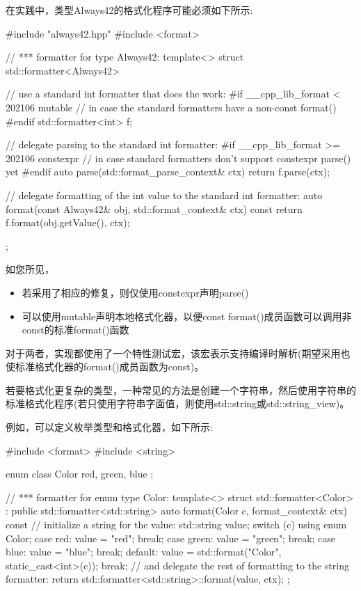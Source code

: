 在实践中，类型Always42的格式化程序可能必须如下所示:


\begin{cpp}
#include "always42.hpp"
#include <format>

// *** formatter for type Always42:
template<>
struct std::formatter<Always42>
{
	// use a standard int formatter that does the work:
#if __cpp_lib_format < 202106
	mutable // in case the standard formatters have a non-const format()
#endif
	std::formatter<int> f;
	
	// delegate parsing to the standard int formatter:
#if __cpp_lib_format >= 202106
	constexpr // in case standard formatters don’t support constexpr parse() yet
#endif
	auto parse(std::format_parse_context& ctx) {
		return f.parse(ctx);
	}
	
	// delegate formatting of the int value to the standard int formatter:
	auto format(const Always42& obj, std::format_context& ctx) const {
		return f.format(obj.getValue(), ctx);
	}
};
\end{cpp}

如您所见，

\begin{itemize}
\item
若采用了相应的修复，则仅使用constexpr声明parse()

\item
可以使用mutable声明本地格式化器，以便const format()成员函数可以调用非const的标准format()函数
\end{itemize}

对于两者，实现都使用了一个特性测试宏，该宏表示支持编译时解析(期望采用也使标准格式化器的format()成员函数为const)。


若要格式化更复杂的类型，一种常见的方法是创建一个字符串，然后使用字符串的标准格式化程序(若只使用字符串字面值，则使用std::string或std::string\_view)。

例如，可以定义枚举类型和格式化器，如下所示:


\begin{cpp}
#include <format>
#include <string>

enum class Color { red, green, blue };

// *** formatter for enum type Color:
template<>
struct std::formatter<Color> : public std::formatter<std::string>
{
	auto format(Color c, format_context& ctx) const {
		// initialize a string for the value:
		std::string value;
		switch (c) {
			using enum Color;
			case red:
				value = "red";
				break;
			case green:
				value = "green";
				break;
			case blue:
				value = "blue";
				break;
			default:
				value = std::format("Color{}", static_cast<int>(c));
				break;
		}
		// and delegate the rest of formatting to the string formatter:
		return std::formatter<std::string>::format(value, ctx);
	}
};
\end{cpp}

